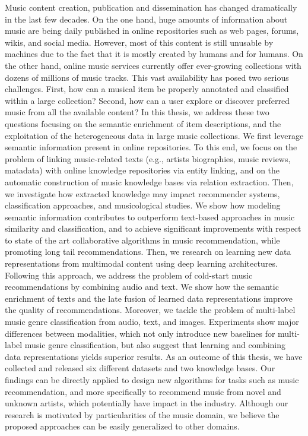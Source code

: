 Music content creation, publication and dissemination has changed dramatically in the last few decades. On the one hand, huge amounts of information about music are being daily published in online repositories such as web pages, forums, wikis, and social media. However, most of this content is still unusable by machines due to the fact that it is mostly created by humans and for humans. On the other hand, online music services currently offer ever-growing collections with dozens of millions of music tracks. This vast availability has posed two serious challenges. First, how can a musical item be properly annotated and classified within a large collection? Second, how can a user explore or discover preferred music from all the available content? In this thesis, we address these two questions focusing on the semantic enrichment of item descriptions, and the exploitation of the heterogeneous data in large music collections. We first leverage semantic information present in online repositories. To this end, we focus on the problem of linking music-related texts (e.g., artists biographies, music reviews, matadata) with online knowledge repositories via entity linking, and on the automatic construction of music knowledge bases via relation extraction. Then, we investigate how extracted knowledge may impact recommender systems, classification approaches, and musicological studies. We show how modeling semantic information contributes to outperform text-based approaches in music similarity and classification, and to achieve significant improvements with respect to state of the art collaborative algorithms in music recommendation, while promoting long tail recommendations. Then, we research on learning new data representations from multimodal content using deep learning architectures. Following this approach, we address the problem of cold-start music recommendations by combining audio and text. We show how the semantic enrichment of texts and the late fusion of learned data representations improve the quality of recommendations. Moreover, we tackle the problem of multi-label music genre classification from audio, text, and images. Experiments show major differences between modalities, which not only introduce new baselines for multi-label music genre classification, but also suggest that learning and combining data representations yields superior results. As an outcome of this thesis, we have collected and released six different datasets and two knowledge bases. Our findings can be directly applied to design new algorithms for tasks such as music recommendation, and more specifically to recommend music from novel and unknown artists, which potentially have impact in the industry. Although our research is motivated by particularities of the music domain, we believe the proposed approaches can be easily generalized to other domains.
